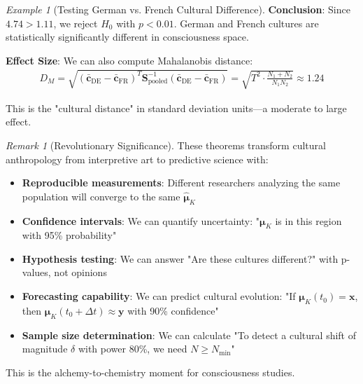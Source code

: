 \documentclass[11pt,a4paper]{article}
\theoremstyle{definition}
\theoremstyle{remark}
\newtheorem{remark}{Remark}[section]
\newtheorem{example}{Example}[section]
\newcommand{\cc}{\mathbf{c}}
\begin{document}
\begin{small}
\begin{example}[Testing German vs. French Cultural Difference]
\textbf{Conclusion}: Since \(4.74 > 1.11\), we reject \(H_0\) with \(p < 0.01\). German and French cultures are statistically significantly different in consciousness space.

\textbf{Effect Size}: We can also compute Mahalanobis distance:
\begin{align}
D_M = \sqrt{(\bar{\cc}_{\text{DE}} - \bar{\cc}_{\text{FR}})^T \mathbf{S}_{\text{pooled}}^{-1} (\bar{\cc}_{\text{DE}} - \bar{\cc}_{\text{FR}})} = \sqrt{T^2 \cdot \frac{N_1+N_2}{N_1 N_2}} \approx 1.24
\end{align}

This is the "cultural distance" in standard deviation units—a moderate to large effect.
\end{example}

\begin{remark}[Revolutionary Significance]
These theorems transform cultural anthropology from interpretive art to predictive science with:
\begin{itemize}
\item \textbf{Reproducible measurements}: Different researchers analyzing the same population will converge to the same \(\hat{\boldsymbol{\mu}}_K\)
\item \textbf{Confidence intervals}: We can quantify uncertainty: "\(\boldsymbol{\mu}_K\) is in this region with 95\% probability"
\item \textbf{Hypothesis testing}: We can answer "Are these cultures different?" with p-values, not opinions
\item \textbf{Forecasting capability}: We can predict cultural evolution: "If \(\boldsymbol{\mu}_K(t_0) = \mathbf{x}\), then \(\boldsymbol{\mu}_K(t_0+\Delta t) \approx \mathbf{y}\) with 90\% confidence"
\item \textbf{Sample size determination}: We can calculate "To detect a cultural shift of magnitude \(\delta\) with power 80\%, we need \(N \geq N_{\min}\)"
\end{itemize}

This is the alchemy-to-chemistry moment for consciousness studies.
\end{remark}


\end{small}
\end{document}

